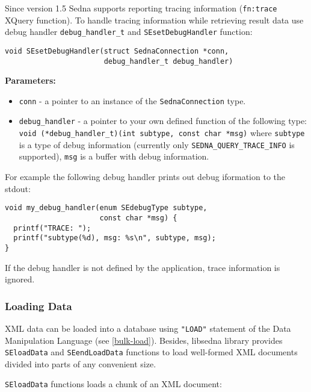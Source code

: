 \documentclass[a4paper,12pt]{article}
\newenvironment{citemize}
{\begin{itemize}
  \setlength{\itemsep}{0pt}
  \setlength{\parskip}{0pt}
  \setlength{\parsep}{0pt}}
{\end{itemize}}
\begin{document}
Since version 1.5 Sedna supports reporting tracing information (\verb!fn:trace!
XQuery function). To handle tracing information while retrieving result data use
debug handler \verb!debug_handler_t! and \verb!SEsetDebugHandler! function:

\begin{verbatim}
void SEsetDebugHandler(struct SednaConnection *conn,
                       debug_handler_t debug_handler)
\end{verbatim}

\noindent
\textbf{Parameters:}

\begin{citemize}
\item\verb!conn! - a pointer to an instance of the \verb!SednaConnection! type.
\item\verb!debug_handler! - a pointer to your own defined function of the
following type: \verb!void (*debug_handler_t)(int subtype, const char *msg)!
where \verb!subtype! is a type of debug information (currently only
\verb!SEDNA_QUERY_TRACE_INFO! is supported), \verb!msg! is a buffer with debug
information.
\end{citemize}

For example the following debug handler prints out debug iformation to the
stdout:

\small{
\begin{verbatim}
void my_debug_handler(enum SEdebugType subtype,
                      const char *msg) {
  printf("TRACE: ");
  printf("subtype(%d), msg: %s\n", subtype, msg);
}
\end{verbatim}}

If the debug handler is not defined by the application, trace information is
ignored.


\subsubsection{Loading Data}

XML data can be loaded into a database using \verb!"LOAD"! statement of the Data
Manipulation Language (see \ref{bulk-load}). Besides, libsedna library provides
\verb!SEloadData! and \verb!SEendLoadData! functions to load well-formed XML
documents divided into parts of any convenient size.

\verb!SEloadData! functions loads a chunk of an XML document:
\end{document}
